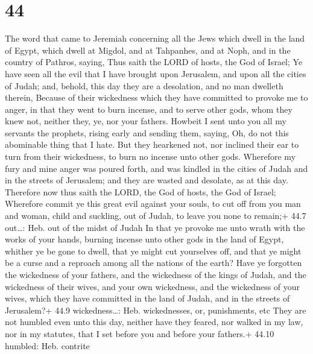 \hypertarget{section-43}{%
\section{44}\label{section-43}}

 The word that came to Jeremiah concerning all the Jews
which dwell in the land of Egypt, which dwell at Migdol, and at
Tahpanhes, and at Noph, and in the country of Pathros, saying,
 Thus saith the LORD of hosts, the God of Israel; Ye have
seen all the evil that I have brought upon Jerusalem, and upon all the
cities of Judah; and, behold, this day they are a desolation, and no man
dwelleth therein,  Because of their wickedness which they
have committed to provoke me to anger, in that they went to burn
incense, and to serve other gods, whom they knew not, neither they, ye,
nor your fathers.  Howbeit I sent unto you all my servants
the prophets, rising early and sending them, saying, Oh, do not this
abominable thing that I hate.  But they hearkened not, nor
inclined their ear to turn from their wickedness, to burn no incense
unto other gods.  Wherefore my fury and mine anger was
poured forth, and was kindled in the cities of Judah and in the streets
of Jerusalem; and they are wasted and desolate, as at this day.
 Therefore now thus saith the LORD, the God of hosts, the
God of Israel; Wherefore commit ye this great evil against your souls,
to cut off from you man and woman, child and suckling, out of Judah, to
leave you none to remain;+ 44.7 out\ldots: Heb. out of the midst of
Judah  In that ye provoke me unto wrath with the works of
your hands, burning incense unto other gods in the land of Egypt,
whither ye be gone to dwell, that ye might cut yourselves off, and that
ye might be a curse and a reproach among all the nations of the earth?
 Have ye forgotten the wickedness of your fathers, and the
wickedness of the kings of Judah, and the wickedness of their wives, and
your own wickedness, and the wickedness of your wives, which they have
committed in the land of Judah, and in the streets of Jerusalem?+ 44.9
wickedness\ldots: Heb. wickednesses, or, punishments, etc 
They are not humbled even unto this day, neither have they feared, nor
walked in my law, nor in my statutes, that I set before you and before
your fathers.+ 44.10 humbled: Heb. contrite


